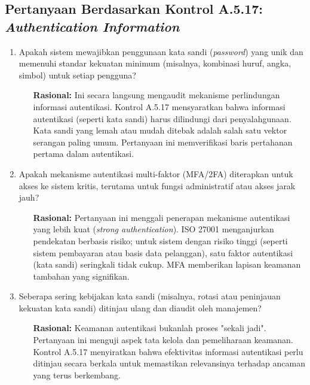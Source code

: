 \documentclass[12pt, a4paper]{report}
\begin{document}
\subsection{Pertanyaan Berdasarkan Kontrol A.5.17: \textit{Authentication Information}}
\begin{enumerate}
    \item Apakah sistem mewajibkan penggunaan kata sandi (\textit{password}) yang unik dan memenuhi standar kekuatan minimum (misalnya, kombinasi huruf, angka, simbol) untuk setiap pengguna?
    \begin{itemize}
        \item[\textbf{Rasional:}] Ini secara langsung mengaudit mekanisme perlindungan informasi autentikasi. Kontrol A.5.17 mensyaratkan bahwa informasi autentikasi (seperti kata sandi) harus dilindungi dari penyalahgunaan. Kata sandi yang lemah atau mudah ditebak adalah salah satu vektor serangan paling umum. Pertanyaan ini memverifikasi baris pertahanan pertama dalam autentikasi.
    \end{itemize}

    \item Apakah mekanisme autentikasi multi-faktor (MFA/2FA) diterapkan untuk akses ke sistem kritis, terutama untuk fungsi administratif atau akses jarak jauh?
    \begin{itemize}
        \item[\textbf{Rasional:}] Pertanyaan ini menggali penerapan mekanisme autentikasi yang lebih kuat (\textit{strong authentication}). ISO 27001 menganjurkan pendekatan berbasis risiko; untuk sistem dengan risiko tinggi (seperti sistem pembayaran atau basis data pelanggan), satu faktor autentikasi (kata sandi) seringkali tidak cukup. MFA memberikan lapisan keamanan tambahan yang signifikan.
    \end{itemize}
    
    \item Seberapa sering kebijakan kata sandi (misalnya, rotasi atau peninjauan kekuatan kata sandi) ditinjau ulang dan diaudit oleh manajemen? \citep{rijal2022iso}
    \begin{itemize}
        \item[\textbf{Rasional:}] Keamanan autentikasi bukanlah proses "sekali jadi". Pertanyaan ini menguji aspek tata kelola dan pemeliharaan keamanan. Kontrol A.5.17 menyiratkan bahwa efektivitas informasi autentikasi perlu ditinjau secara berkala untuk memastikan relevansinya terhadap ancaman yang terus berkembang.
    \end{itemize}
\end{enumerate}
\end{document}
